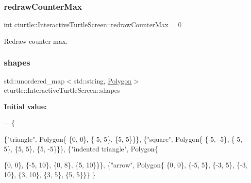 \subsubsection{\texorpdfstring{redraw\+Counter\+Max}{redrawCounterMax}}
{\footnotesize\ttfamily int cturtle\+::\+Interactive\+Turtle\+Screen\+::redraw\+Counter\+Max = 0\hspace{0.3cm}{\ttfamily [protected]}}

Redraw counter max. \mbox{\label{classcturtle_1_1InteractiveTurtleScreen_ac11df426fc4bc95a516e5491af3f0c7e}} 
\subsubsection{\texorpdfstring{shapes}{shapes}}
{\footnotesize\ttfamily std\+::unordered\+\_\+map$<$std\+::string, \hyperlink{classcturtle_1_1Polygon}{Polygon}$>$ cturtle\+::\+Interactive\+Turtle\+Screen\+::shapes\hspace{0.3cm}{\ttfamily [protected]}}

{\bfseries Initial value\+:}
\begin{DoxyCode}
= \{
            
            \{\textcolor{stringliteral}{"triangle"},
                Polygon\{
                    \{0, 0\},
                    \{-5, 5\},
                    \{5, 5\}\}\},
            \{\textcolor{stringliteral}{"square"},
                Polygon\{
                    \{-5, -5\},
                    \{-5, 5\},
                    \{5, 5\},
                    \{5, -5\}\}\},
            \{\textcolor{stringliteral}{"indented triangle"},
                Polygon\{
                    
                    \{0, 0\},
                    \{-5, 10\},
                    \{0, 8\},
                    \{5, 10\}\}\},
            \{\textcolor{stringliteral}{"arrow"},
                Polygon\{
                    \{0, 0\},
                    \{-5, 5\},
                    \{-3, 5\},
                    \{-3, 10\},
                    \{3, 10\},
                    \{3, 5\},
                    \{5, 5\}\}\}
        \}
\end{DoxyCode}
\mbox{\label{classcturtle_1_1InteractiveTurtleScreen_ae227fdb4ee9017964e314d6e0c76cee4}} 
